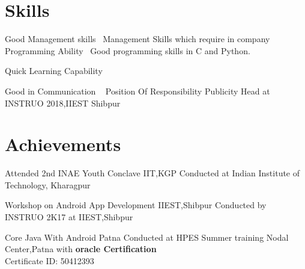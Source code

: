 \documentclass[]{cv-style}          %
\begin{document}
\section{Skills}
  \vspace{-0.3cm}
\begin{entrylist}
\entry
  {}
  {Good Management skills}
  {}
  {\jobtitle{}\ Management Skills which require in company}
\entry
  {}
  {Programming Ability }
  {}
  {\jobtitle{}\ Good programming skills in C and Python.}
  
  \entry
  {}
  {Quick Learning Capability}
  {}
 {\jobtitle{}\ }
  
  \entry
  {}
  {Good in Communication }
  {}
  {\jobtitle{}\ }
     \entry
  {}
  {Position Of Responsibility }
  {}
  {\jobtitle{}\-Publicity Head at INSTRUO 2018,IIEST Shibpur }

\end{entrylist}



\section{Achievements}

\begin{entrylist}
\entry
{}
{Attended 2nd INAE Youth Conclave}
{IIT,KGP}
{Conducted at Indian Institute of Technology, Kharagpur}

\end{entrylist}
\begin{entrylist}
\entry
{}
{Workshop on Android App Development}
{IIEST,Shibpur}
{Conducted by INSTRUO 2K17 at IIEST,Shibpur}

\end{entrylist}
\begin{entrylist}
\entry
{}
{Core Java With Android}
{Patna}
{Conducted at HPES Summer training Nodal Center,Patna with \textbf{oracle Certification}\\Certificate ID: 50412393}

\end{entrylist}\\\\\
\end{document}

